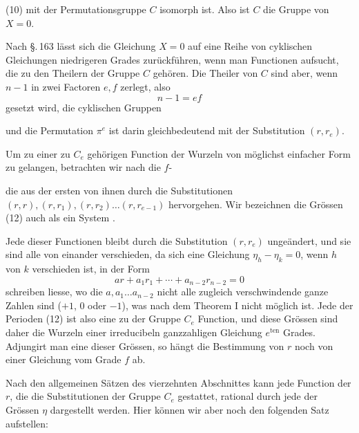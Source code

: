 
(10) mit der Permutationsgruppe $C$ isomorph ist. Also ist $C$ die  Gruppe von $X = 0$.

Nach \S.\,163 lässt sich die Gleichung $X = 0$ auf eine Reihe von cyklischen Gleichungen niedrigeren Grades zurückführen, wenn man Functionen aufsucht, die zu den Theilern der Gruppe $C$ gehören. Die Theiler von $C$ sind aber, wenn $n - 1$ in zwei Factoren $e, f$ zerlegt, also
\[
n - 1 = ef
\]
gesetzt wird, die cyklischen Gruppen


und die Permutation $\pi^e$ ist darin gleichbedeutend mit der Substitution $(r, r_e)$.

Um zu einer zu $C_e$ gehörigen Function der Wurzeln von möglichst einfacher Form zu gelangen, betrachten wir nach  die $f$-


die aus der ersten von ihnen durch die Substitutionen $(r, r), (r, r_1), (r, r_2) \ldots (r, r_{e-1})$ hervorgehen. Wir bezeichnen die Grössen (12) auch als ein System .

Jede dieser Functionen bleibt durch die Substitution $(r, r_e)$ ungeändert, und sie sind alle von einander verschieden, da sich eine Gleichung $\eta_h - \eta_k = 0$, wenn $h$ von $k$ verschieden ist, in der Form
\[
a r + a_1 r_1 + \cdots + a_{n-2} r_{n-2} = 0
\]
schreiben liesse, wo die $a, a_1 \ldots a_{n-2}$ nicht alle zugleich verschwindende ganze Zahlen sind ($+ 1$, $0$ oder $- 1$), was nach dem Theorem I nicht möglich ist. Jede der Perioden (12) ist also eine zu der Gruppe $C_e$  Function, und diese Grössen sind daher die Wurzeln einer irreducibeln ganzzahligen Gleichung $e^{\mathrm{ten}}$ Grades. Adjungirt man eine dieser Grössen, so hängt die Bestimmung von $r$ noch von einer Gleichung vom Grade $f$ ab.

Nach den allgemeinen Sätzen des vierzehnten Abschnittes kann jede Function der $r$, die die Substitutionen der Gruppe $C_e$ gestattet, rational durch jede der Grössen $\eta$ dargestellt werden. Hier können wir aber noch den folgenden Satz aufstellen:
